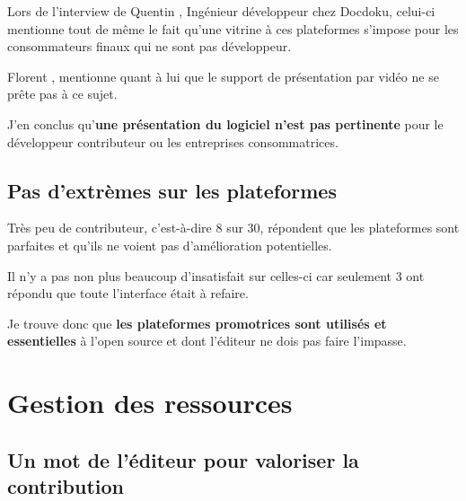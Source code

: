 			Lors de l'interview de Quentin , Ingénieur développeur chez Docdoku, celui-ci mentionne tout de même le fait qu'une vitrine à ces plateformes s'impose pour les consommateurs finaux qui ne sont pas développeur.

			\begin{center}
				\textit{
				}
			\end{center}

			Florent , mentionne quant à lui que le support de présentation par vidéo ne se prête pas à ce sujet.

			\begin{center}
				\textit{
				}
			\end{center}

			J'en conclus qu'\textbf{une présentation du logiciel n'est pas pertinente} pour le développeur contributeur ou les entreprises consommatrices.

		\subsection{Pas d'extrèmes sur les plateformes}

			Très peu de contributeur, c'est-à-dire 8 sur 30, répondent que les plateformes sont parfaites et qu'ils ne voient pas d'amélioration potentielles.

			Il n'y a pas non plus beaucoup d'insatisfait sur celles-ci car seulement 3 ont répondu que toute l'interface était à refaire.

			Je trouve donc que \textbf{les plateformes promotrices sont utilisés et essentielles} à l'open source et dont l'éditeur ne dois pas faire l'impasse.

	\section{Gestion des ressources}

		\subsection{Un mot de l'éditeur pour valoriser la contribution}

